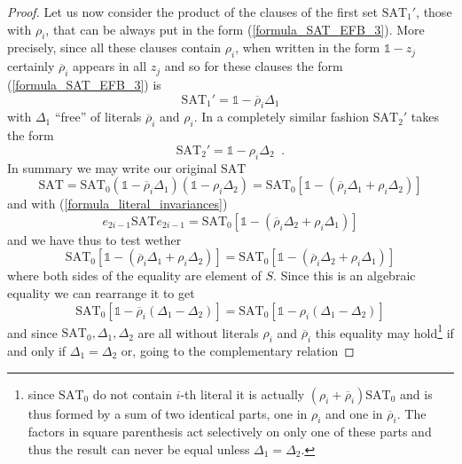 \documentclass[a4paper,twoside,11pt]{article}
\begin{document}
\begin{proof}
Let us now consider the product of the clauses of the first set ${\ensuremath{\mbox{SAT}}}_1'$, those with ${\ensuremath{\rho}}_i$, that can be always put in the form (\ref{formula_SAT_EFB_3}). More precisely, since all these clauses contain ${\ensuremath{\rho}}_i$, when written in the form ${\ensuremath{\mathbb{1}}} - z_j$ certainly ${\overline{\ensuremath{\rho}}}_i$ appears in all $z_j$ and so for these clauses the form (\ref{formula_SAT_EFB_3}) is
$$
{\ensuremath{\mbox{SAT}}}_1' = {\ensuremath{\mathbb{1}}} - {\overline{\ensuremath{\rho}}}_i \Delta_1
$$
with $\Delta_1$ ``free'' of literals ${\overline{\ensuremath{\rho}}}_i$ and ${\ensuremath{\rho}}_i$. In a completely similar fashion ${\ensuremath{\mbox{SAT}}}_2'$ takes the form
$$
{\ensuremath{\mbox{SAT}}}_2' = {\ensuremath{\mathbb{1}}} - {\ensuremath{\rho}}_i \Delta_2 {\;\; \mathrm{.}}
$$
In summary we may write our original {\ensuremath{\mbox{SAT}}}{}
\begin{equation}
\label{formula_sat_subproblems}
{\ensuremath{\mbox{SAT}}} = {\ensuremath{\mbox{SAT}}}_0 ({\ensuremath{\mathbb{1}}} - {\overline{\ensuremath{\rho}}}_i \Delta_1) ({\ensuremath{\mathbb{1}}} - {\ensuremath{\rho}}_i \Delta_2) = {\ensuremath{\mbox{SAT}}}_0 \left[{\ensuremath{\mathbb{1}}} - ({\overline{\ensuremath{\rho}}}_i \Delta_1 + {\ensuremath{\rho}}_i \Delta_2)\right]
\end{equation}
and with (\ref{formula_literal_invariances})
$$
{e}_{2 i - 1} {\ensuremath{\mbox{SAT}}} {e}_{2 i - 1} = 
{\ensuremath{\mbox{SAT}}}_0 \left[{\ensuremath{\mathbb{1}}} - ({\overline{\ensuremath{\rho}}}_i \Delta_2 + {\ensuremath{\rho}}_i \Delta_1)\right]
$$
and we have thus to test wether
$$
{\ensuremath{\mbox{SAT}}}_0 \left[{\ensuremath{\mathbb{1}}} - ({\overline{\ensuremath{\rho}}}_i \Delta_1 + {\ensuremath{\rho}}_i \Delta_2)\right] = {\ensuremath{\mbox{SAT}}}_0 \left[{\ensuremath{\mathbb{1}}} - ({\overline{\ensuremath{\rho}}}_i \Delta_2 + {\ensuremath{\rho}}_i \Delta_1)\right]
$$
where both sides of the equality are element of $S$. Since this is an algebraic equality we can rearrange it to get
$$
{\ensuremath{\mbox{SAT}}}_0 \left[{\ensuremath{\mathbb{1}}} - {\overline{\ensuremath{\rho}}}_i (\Delta_1 - \Delta_2)\right] = {\ensuremath{\mbox{SAT}}}_0 \left[{\ensuremath{\mathbb{1}}} - {\ensuremath{\rho}}_i (\Delta_1 - \Delta_2)\right]
$$
and since ${\ensuremath{\mbox{SAT}}}_0, \Delta_1, \Delta_2$ are all without literals ${\ensuremath{\rho}}_i$ and ${\overline{\ensuremath{\rho}}}_i$ this equality may hold\footnote{since ${\ensuremath{\mbox{SAT}}}_0$ do not contain $i$-th literal it is actually $({\ensuremath{\rho}}_i + {\overline{\ensuremath{\rho}}}_i) {\ensuremath{\mbox{SAT}}}_0$ and is thus formed by a sum of two identical parts, one in ${\ensuremath{\rho}}_i$ and one in ${\overline{\ensuremath{\rho}}}_i$.  The factors in square parenthesis act selectively on only one of these parts and thus the result can never be equal unless $\Delta_1 = \Delta_2$.}{} if and only if $\Delta_1 = \Delta_2$ or, going to the complementary relation

\end{proof}
\end{document}
